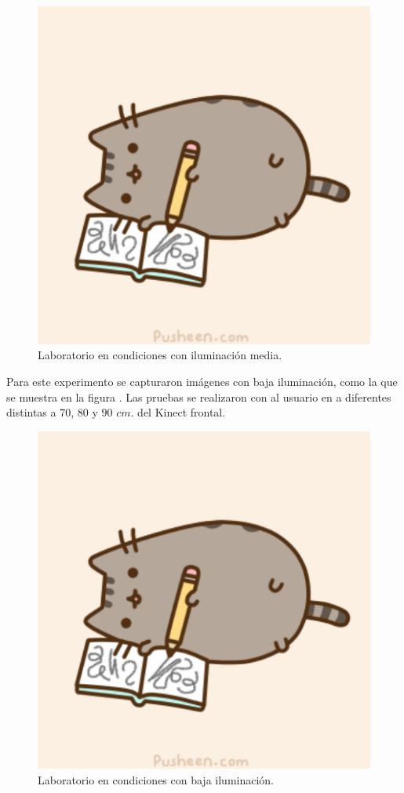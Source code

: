 \begin{figure}[h!]
\begin{center} 
\includegraphics[scale=0.3]{./Figures/pusheen.png}
\end{center}
\caption{Laboratorio en condiciones con iluminación media.}
\label{fig:LabMedioIluminado} 
\end{figure} 

Para este experimento se capturaron imágenes con baja iluminación, como la que se muestra en la figura . Las pruebas se realizaron con al usuario en a diferentes distintas a $70$, $80$ y $90$ $cm.$ del Kinect frontal. 

\begin{figure}[h!]
\begin{center} 
\includegraphics[scale=0.3]{./Figures/pusheen.png}
\end{center}
\caption{Laboratorio en condiciones con baja iluminación.}
\label{fig:LabNoIluminado} 
\end{figure}

